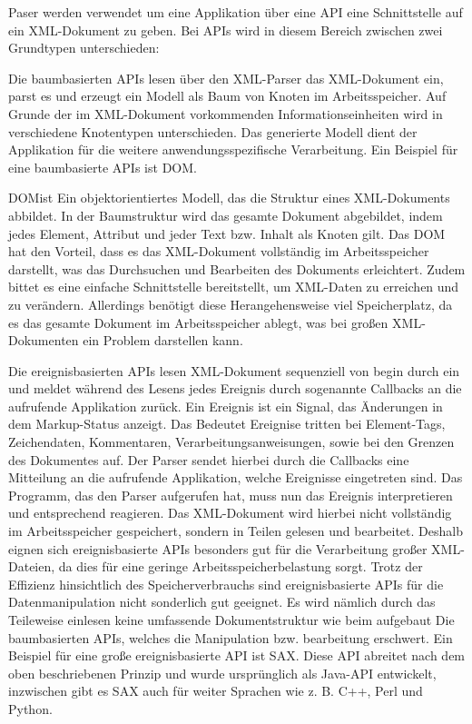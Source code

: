 Paser werden verwendet um eine Applikation über eine \ac{API} eine Schnittstelle auf ein \ac{XML}-Dokument zu geben.
Bei \ac{API}s wird in diesem Bereich zwischen zwei Grundtypen unterschieden:\cite*[405]{Becher2022}

Die baumbasierten \ac{API}s lesen über den XML-Parser das XML-Dokument ein,
parst es und erzeugt ein Modell als Baum von Knoten im Arbeitsspeicher.
Auf Grunde der im XML-Dokument vorkommenden Informationseinheiten wird in verschiedene Knotentypen unterschieden.
Das generierte Modell dient der Applikation für die weitere anwendungsspezifische Verarbeitung.
Ein Beispiel für eine baumbasierte \ac{API}s ist \ac{DOM}.

\ac{DOM}ist Ein objektorientiertes Modell, das die Struktur eines XML-Dokuments abbildet.
In der Baumstruktur wird das gesamte Dokument abgebildet, indem jedes Element, Attribut und jeder Text bzw. Inhalt als Knoten gilt.
Das DOM hat den Vorteil, dass es das \ac{XML}-Dokument vollständig im Arbeitsspeicher darstellt, was das Durchsuchen und Bearbeiten des Dokuments erleichtert.
Zudem bittet es eine einfache Schnittstelle bereitstellt, um XML-Daten zu erreichen und zu verändern.
Allerdings benötigt diese Herangehensweise viel Speicherplatz,
da es das gesamte Dokument im Arbeitsspeicher ablegt, was bei großen \ac{XML}-Dokumenten ein Problem darstellen kann.\cite*[413,414]{Becher2022}


Die ereignisbasierten \ac{API}s lesen \ac{XML}-Dokument sequenziell von begin durch
ein und meldet während des Lesens jedes Ereignis durch sogenannte Callbacks an die aufrufende Applikation zurück.
Ein Ereignis ist ein Signal, das Änderungen in dem Markup-Status anzeigt.
Das Bedeutet Ereignise tritten bei Element-Tags, Zeichendaten, Kommentaren, Verarbeitungsanweisungen, sowie bei den Grenzen des Dokumentes auf.
Der Parser sendet hierbei durch die Callbacks eine Mitteilung an die aufrufende Applikation, welche Ereignisse eingetreten sind.
Das Programm, das den Parser aufgerufen hat, muss nun das Ereignis interpretieren und entsprechend reagieren.
Das \ac{XML}-Dokument wird hierbei nicht vollständig im Arbeitsspeicher gespeichert, sondern in Teilen gelesen und bearbeitet.
Deshalb eignen sich ereignisbasierte \ac{API}s besonders gut für die Verarbeitung großer \ac{XML}-Dateien, da dies für eine geringe Arbeitsspeicherbelastung sorgt.
Trotz der Effizienz hinsichtlich des Speicherverbrauchs sind ereignisbasierte \ac{API}s für die Datenmanipulation nicht sonderlich gut geeignet.
Es wird nämlich durch das Teileweise einlesen keine umfassende Dokumentstruktur wie beim aufgebaut Die baumbasierten \ac{API}s,
welches die Manipulation bzw. bearbeitung erschwert.
Ein Beispiel für eine große ereignisbasierte \ac{API} ist \ac{SAX}.
Diese \ac{API} abreitet nach dem oben beschriebenen Prinzip und wurde ursprünglich als Java-\ac{API} entwickelt, inzwischen gibt es \ac{SAX} auch für weiter Sprachen wie
z. B. C++, Perl und Python.\cite*[405]{Becher2022}

